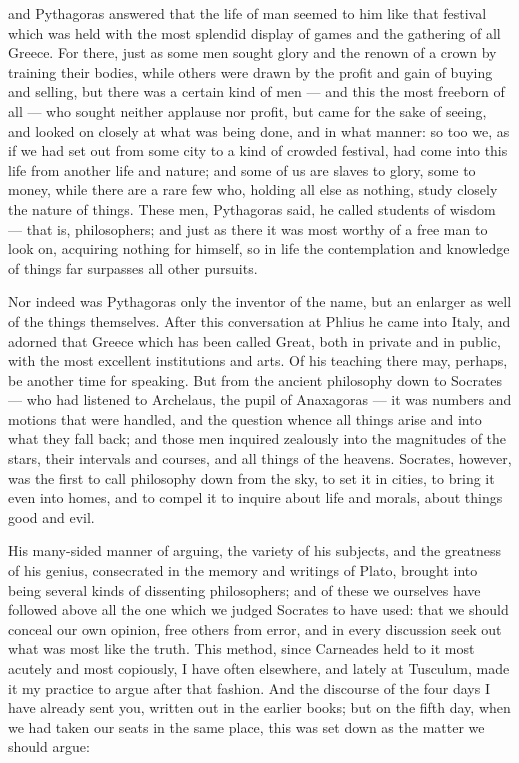  and Pythagoras answered that the life of man seemed to him like that festival which was held with the most splendid display of games and the gathering of all Greece. For there, just as some men sought glory and the renown of a crown by training their bodies, while others were drawn by the profit and gain of buying and selling, but there was a certain kind of men — and this the most freeborn of all — who sought neither applause nor profit, but came for the sake of seeing, and looked on closely at what was being done, and in what manner: so too we, as if we had set out from some city to a kind of crowded festival, had come into this life from another life and nature; and some of us are slaves to glory, some to money, while there are a rare few who, holding all else as nothing, study closely the nature of things. These men, Pythagoras said, he called students of wisdom — that is, philosophers; and just as there it was most worthy of a free man to look on, acquiring nothing for himself, so in life the contemplation and knowledge of things far surpasses all other pursuits.

 Nor indeed was Pythagoras only the inventor of the name, but an enlarger as well of the things themselves. After this conversation at Phlius he came into Italy, and adorned that Greece which has been called Great, both in private and in public, with the most excellent institutions and arts. Of his teaching there may, perhaps, be another time for speaking. But from the ancient philosophy down to Socrates — who had listened to Archelaus, the pupil of Anaxagoras — it was numbers and motions that were handled, and the question whence all things arise and into what they fall back; and those men inquired zealously into the magnitudes of the stars, their intervals and courses, and all things of the heavens. Socrates, however, was the first to call philosophy down from the sky, to set it in cities, to bring it even into homes, and to compel it to inquire about life and morals, about things good and evil.

 His many-sided manner of arguing, the variety of his subjects, and the greatness of his genius, consecrated in the memory and writings of Plato, brought into being several kinds of dissenting philosophers; and of these we ourselves have followed above all the one which we judged Socrates to have used: that we should conceal our own opinion, free others from error, and in every discussion seek out what was most like the truth. This method, since Carneades held to it most acutely and most copiously, I have often elsewhere, and lately at Tusculum, made it my practice to argue after that fashion. And the discourse of the four days I have already sent you, written out in the earlier books; but on the fifth day, when we had taken our seats in the same place, this was set down as the matter we should argue:

